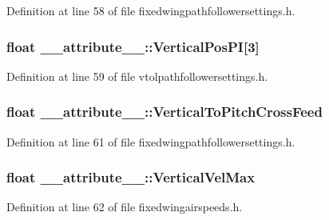 \-Definition at line 58 of file fixedwingpathfollowersettings.\-h.

\hypertarget{struct____attribute_____adfde66ef386f1e69693430e3c38170d1}{
\subsubsection[{\-Vertical\-Pos\-P\-I}]{\setlength{\rightskip}{0pt plus 5cm}float {\bf \-\_\-\-\_\-attribute\-\_\-\-\_\-\-::\-Vertical\-Pos\-P\-I}\mbox{[}3\mbox{]}}}\label{struct____attribute_____adfde66ef386f1e69693430e3c38170d1}


\-Definition at line 59 of file vtolpathfollowersettings.\-h.

\hypertarget{struct____attribute_____ad9fc0be654bdc5b0336662a74911107a}{
\subsubsection[{\-Vertical\-To\-Pitch\-Cross\-Feed}]{\setlength{\rightskip}{0pt plus 5cm}float {\bf \-\_\-\-\_\-attribute\-\_\-\-\_\-\-::\-Vertical\-To\-Pitch\-Cross\-Feed}}}\label{struct____attribute_____ad9fc0be654bdc5b0336662a74911107a}


\-Definition at line 61 of file fixedwingpathfollowersettings.\-h.

\hypertarget{struct____attribute_____a7b8167689ee7323295141130ff24865d}{
\subsubsection[{\-Vertical\-Vel\-Max}]{\setlength{\rightskip}{0pt plus 5cm}float {\bf \-\_\-\-\_\-attribute\-\_\-\-\_\-\-::\-Vertical\-Vel\-Max}}}\label{struct____attribute_____a7b8167689ee7323295141130ff24865d}


\-Definition at line 62 of file fixedwingairspeeds.\-h.

